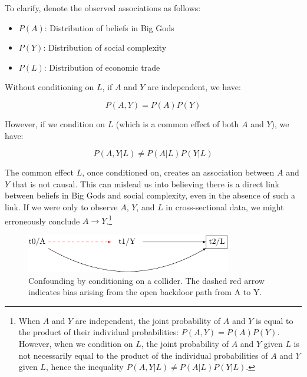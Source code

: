 \documentclass[
  singlecolumn]{report}
\providecommand{\tightlist}{%
  \setlength{\itemsep}{0pt}\setlength{\parskip}{0pt}}\usepackage{longtable,booktabs,array}
\begin{document}
To clarify, denote the observed associations as follows:

\begin{itemize}
\tightlist
\item
  \(P(A)\): Distribution of beliefs in Big Gods
\item
  \(P(Y)\): Distribution of social complexity
\item
  \(P(L)\): Distribution of economic trade
\end{itemize}

Without conditioning on \(L\), if \(A\) and \(Y\) are independent, we
have:

\[P(A, Y) = P(A)P(Y)\]

However, if we condition on \(L\) (which is a common effect of both
\(A\) and \(Y\)), we have:

\[P(A, Y | L) \neq P(A | L)P(Y | L)\]

The common effect \(L\), once conditioned on, creates an association
between \(A\) and \(Y\) that is not causal. This can mislead us into
believing there is a direct link between beliefs in Big Gods and social
complexity, even in the absence of such a link. If we were only to
observe \(A\), \(Y\), and \(L\) in cross-sectional data, we might
erroneously conclude \(A \to Y\).\footnote{When \(A\) and \(Y\) are
  independent, the joint probability of \(A\) and \(Y\) is equal to the
  product of their individual probabilities: \(P(A, Y) = P(A)P(Y)\).
  However, when we condition on \(L\), the joint probability of \(A\)
  and \(Y\) given \(L\) is not necessarily equal to the product of the
  individual probabilities of \(A\) and \(Y\) given \(L\), hence the
  inequality \(P(A, Y | L) \neq P(A | L)P(Y | L)\).}

\begin{figure}

{\centering \includegraphics[width=0.8\textwidth,height=\textheight]{causal-dags_files/figure-pdf/fig-dag-common-effect-1.pdf}

}

\caption{\label{fig-dag-common-effect}Confounding by conditioning on a
collider. The dashed red arrow indicates bias arising from the open
backdoor path from A to Y.}

\end{figure}
\end{document}
